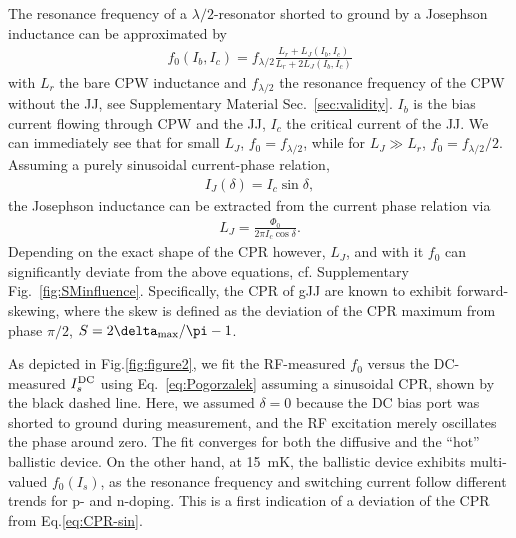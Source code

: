 The resonance frequency of a $\lambda/2$-resonator shorted to ground by a Josephson inductance can be approximated by
\begin{align}
f_0\left(I_b,I_c\right) = f_{\lambda/2} \frac{L_r+L_J\left(I_b, I_c\right)}{L_r +  2L_J\left(I_b, I_c\right)}
\label{eq:Pogorzalek}
\end{align}
%
with $L_r$ the bare CPW inductance and $f_{\lambda/2}$ the resonance frequency of the CPW without the JJ, see Supplementary Material Sec.~\ref{sec:validity}.
%
$I_b$ is the bias current flowing through CPW and the JJ, $I_c$ the critical current of the JJ.
%
We can immediately see that for small $L_J$, $f_0=f_{\lambda/2}$, while for $L_J\gg L_r$, $f_0=f_{\lambda/2}/2$.
%
Assuming a purely sinusoidal current-phase relation,
%
\begin{align}
I_J(\delta) = I_c\sin\delta,
\label{eq:CPR-sin}
\end{align}
%
the Josephson inductance can be extracted from the current phase relation via
%
\begin{align}
L_J = \frac{\Phi_0}{2\pi I_c \cos\delta}.
\label{eq:LJsin}
\end{align}
%
Depending on the exact shape of the CPR however, $L_J$, and with it $f_0$ can significantly deviate from the above equations, cf. Supplementary Fig.~\ref{fig:SMinfluence}.
%
Specifically, the CPR of gJJ are known to exhibit forward-skewing, where the skew is defined as the deviation of the CPR maximum from phase $\pi/2$, $S=2\delta_{\rm max}/\pi -1$.

As depicted in Fig.\ref{fig:figure2}, we fit the RF-measured $f_0$ versus the DC-measured $I_s^{\rm DC}$ using Eq.~\ref{eq:Pogorzalek} assuming a sinusoidal CPR, shown by the black dashed line.
%
Here, we assumed $\delta=0$ because the DC bias port was shorted to ground during measurement, and the RF excitation merely oscillates the phase around zero.
%
The fit converges for both the diffusive and the “hot” ballistic device.
%
On the other hand, at \SI{15}{\milli\kelvin}, the ballistic device exhibits multi-valued $f_0\left(I_s\right)$, as the resonance frequency and switching current follow different trends for p- and n-doping.
%
This is a first indication of a deviation of the CPR from Eq.\ref{eq:CPR-sin}.


